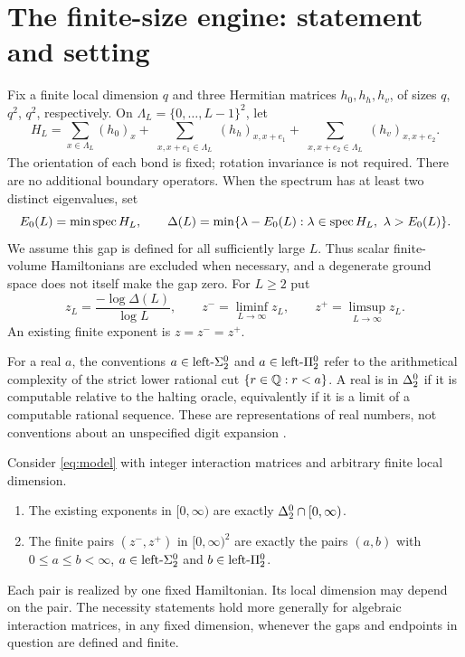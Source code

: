\section{The finite-size engine: statement and setting}\label{sec:statement}
Fix a finite local dimension $q$ and three Hermitian matrices $h_0,h_h,h_v$,
of sizes $q$, $q^2$, $q^2$, respectively. On
$\Lambda_L=\{0,\ldots,L-1\}^2$, let
\begin{equation}\label{eq:model}
 H_L=\sum_{x\in\Lambda_L}(h_0)_x+
 \sum_{\substack{x,x+e_1\in\Lambda_L}}(h_h)_{x,x+e_1}+
 \sum_{\substack{x,x+e_2\in\Lambda_L}}(h_v)_{x,x+e_2}.
\end{equation}
The orientation of each bond is fixed; rotation invariance is not required.
There are no additional boundary operators. When the spectrum has at least
two distinct eigenvalues, set
\begin{equation}\label{eq:gap}
 E_0(L)=\min\spec H_L,\qquad
 \Delta(L)=\min\{\lambda-E_0(L):\lambda\in\spec H_L,\ \lambda>E_0(L)\}.
\end{equation}
We assume this gap is defined for all sufficiently large $L$. Thus scalar
finite-volume Hamiltonians are excluded when necessary, and a degenerate
ground space does not itself make the gap zero. For $L\geq2$ put
\begin{equation}\label{eq:exponents}
 z_L=\frac{-\log\Delta(L)}{\log L},\qquad
 z^-=\liminf_{L\to\infty}z_L,\qquad
 z^+=\limsup_{L\to\infty}z_L.
\end{equation}
An existing finite exponent is $z=z^-=z^+$.

For a real $a$, the conventions $a\in\text{left-}\Sigma^0_2$ and $a\in\text{left-}\Pi^0_2$ refer to
the arithmetical complexity of the strict lower rational cut
$\{r\in\mathbb Q:r<a\}$. A real is in $\Delta^0_2$ if it is computable relative
to the halting oracle, equivalently if it is a limit of a computable
rational sequence. These are representations of real numbers, not
conventions about an unspecified digit expansion
\cite{zhengWeihrauch,density}.

\begin{theorem}\label{thm:classification}
Consider \eqref{eq:model} with integer interaction matrices and arbitrary
finite local dimension.
\begin{enumerate}
\item The existing exponents in $[0,\infty)$ are exactly
      $\Delta^0_2\cap[0,\infty)$.
\item The finite pairs $(z^-,z^+)$ in $[0,\infty)^2$ are exactly
      the pairs $(a,b)$ with $0\leq a\leq b<\infty$,
      $a\in\text{left-}\Sigma^0_2$ and $b\in\text{left-}\Pi^0_2$.
\end{enumerate}
Each pair is realized by one fixed Hamiltonian. Its local dimension may
depend on the pair. The necessity statements hold more generally for
algebraic interaction matrices, in any fixed dimension, whenever the gaps
and endpoints in question are defined and finite.
\end{theorem}

